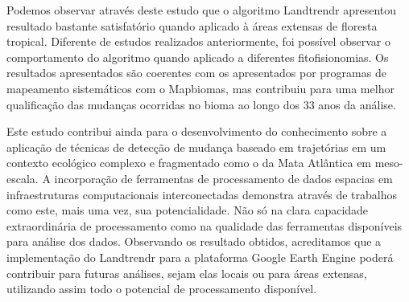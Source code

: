\hspace{13pt} Podemos observar através deste estudo que o algoritmo Landtrendr apresentou resultado bastante satisfatório quando aplicado à áreas extensas de floresta tropical. Diferente de estudos realizados anteriormente, foi possível observar o comportamento do algoritmo quando aplicado a diferentes fitofisionomias. Os resultados apresentados são coerentes com os apresentados por programas de mapeamento sistemáticos com o Mapbiomas, mas contribuiu para uma melhor qualificação das mudanças ocorridas no bioma ao longo dos 33 anos da análise. 

Este estudo contribui ainda para o desenvolvimento do conhecimento sobre a aplicação de técnicas de detecção de mudança baseado em trajetórias em um contexto ecológico complexo e fragmentado como o da Mata Atlântica em meso-escala. A incorporação de ferramentas de processamento de dados espacias em infraestruturas computacionais interconectadas demonstra através de trabalhos como este, mais uma vez, sua potencialidade. Não só na clara capacidade extraordinária de processamento como na qualidade das ferramentas disponíveis para análise dos dados. Observando os resultado obtidos, acreditamos que a implementação do Landtrendr para a plataforma Google Earth Engine poderá contribuir para futuras análises, sejam elas locais ou para áreas extensas, utilizando assim todo o potencial de processamento disponível.
